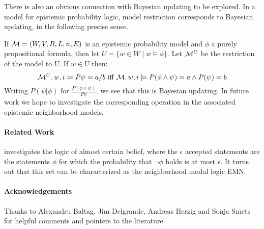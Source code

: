 \documentclass[12pt]{article}
\theoremstyle{definition}
\newcommand{\M}{{\cal M}}      %
\begin{document}
There is also an obvious connection with Bayesian updating to be explored. 
In a model for epistemic probability logic, model restriction
corresponds to Bayesian updating, in the following precise sense.

If $\M = (W,V,R,L,n,E)$ is an epistemic probability model and 
$\phi$ a purely propositional formula, then let $U = \{ w \in W \mid 
  w \models \phi \}$. Let $\M^U$ be the restriction of
  the model to $U$. If $w \in U$ then: 
\[
  \M^U, w , i \models P \psi = a/b 
 \text{ iff } 
  \M,w,i\models P(\phi \land \psi) = a 
                   \land 
                  P(\psi) = b 
\]
Writing $P(\psi | \phi)$ for $\frac{P(\phi \land \psi)}{P\psi}$.  we
see that this is Bayesian updating.  In future work we hope to
investigate the corresponding operation in the associated epistemic
neighborhood models.

\paragraph{Related Work} 

\cite{KyburgTeng2012:tlorkr} investigates the logic of almost certain
belief, where the $\epsilon$ accepted statements are the statements 
$\phi$ for which the probability that $\neg \phi$ holds is at most 
$\epsilon$. It turns out that this set can be characterized as the 
neighborhood modal logic EMN. 

\cite{Herzig2003:mpbaa} 

\paragraph{Acknowledgements} 

Thanks to Alexandru Baltag, Jim Delgrande, Andreas Herzig and Sonja Smets for 
helpful comments and pointers to the literature. 


  
\end{document}
